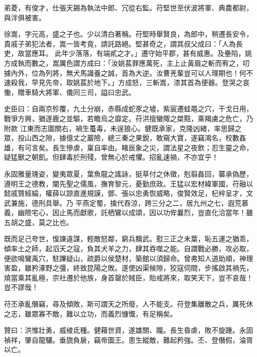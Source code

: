 \begin{pinyinscope}
 弟菱，有俊才，仕張天錫為執法中郎、冗從右監。苻堅世至伏波將軍、典農都尉，與泮俱被害。



 徐嵩，字元高，盛之子也。少以清白著稱。苻堅時舉賢良，為郎中，稍遷長安令，貴戚子弟犯法者，嵩一皆考竟，請託路絕。堅甚奇之，謂其叔父成曰：「人為長吏，故當應耳。
 此年少落落，有端貳之才。」遷守始平郡，甚有威惠。及壘陷，姚方成執而數之，嵩厲色謂方成曰：「汝姚萇罪應萬死，主上止黃眉之斬而宥之，叨據內外，位為列將，無犬馬識養之誠，首為大逆。汝曹羌輩豈可以人理期也！何不速殺我，早見先帝，取姚萇於地下。」方成怒，三斬嵩，漆其首為便器。登哭之哀慟，贈車騎大將軍、儀同三司，謚曰忠武。



 史臣曰：自兩京殄覆，九土分崩，赤縣成蛇豕之墟，紫宸遷蛙黽之穴，干戈日用，戰爭方興，猶逐鹿之並驅，若瞻烏之靡定。苻洪擅蠻陬之桀黠，乘羯虜之危亡，乃附款
 江東而志圖關右，禍生蠆毒，未逞狼心。健既承家，克隆凶緒，率思歸之眾，投山西之隙，據億丈之巖險，總三秦之果銳，敢窺大寶，遂竊鴻名，校數姦雄，有可言矣。長生慘虐，稟自率由。睹辰象之災，謂法星之夜飲；忍生靈之命，疑猛獸之朝飢。但肆毒於刑殘，曾無心於戒懼。招亂速禍，不亦宜乎！



 永固雅量瑰姿，變夷眾夏，葉魚龍之謠詠，挺草付之休徵，剋翦姦回，纂承偽歷，遵明王之德教，闡先聖之儒風，撫育黎元，憂勤庶政。王猛以宏材緯軍國，苻融以懿戚贊經綸，權薛以諒直進規謨，鄧、張以忠勇恢威略，俊賢效足，杞梓呈才，文武兼施，德刑具舉。乃
 平燕定蜀，擒代吞涼，跨三分之二，居九州之七，遐荒慕義，幽險宅心，因止馬而獻歌，託栖鸞以成頌，因以功侔曩烈，豈直化洽當年！雖五胡之盛，莫之比也。



 既而足己夸世，愎諫違謀，輕敵怒鄰，窮兵黷武。懟三正之未葉，恥五運之猶乖，傾率土之師，起滔天之寇，負其犬羊之力，肆其吞噬之能。自謂戰必勝，攻必取，便欲鳴鸞禹穴，駐蹕疑山，疏爵以侯楚材，築館以須歸命。曾弗知人道助順，神理害盈，雖矜涿野之彊，終致昆陽之敗。遂使凶渠候隙，狡寇伺間，步搖啟其禍先，燒當乘其亂極，宗社遷於他族，身首罄於賊臣，貽戒將來，取笑天下，豈不哀哉！
 豈不謬哉！



 苻丕承亂僭竊，尋及傾敗，斯可謂天之所廢，人不能支。苻登集離散之兵，厲死休之志，雖眾寡不敵，難以立功，而義烈慷慨，有足稱矣。



 贊曰：洪惟壯勇，威棱氐種。健藉世資，遂雄關、隴。長生昏虐，敗不旋踵。永固禎祥，肇自龍驤。垂旒負扆，竊帝圖王。患生縱敵，難起矜強。丕、登僭假，淪胥以亡。



\end{pinyinscope}
